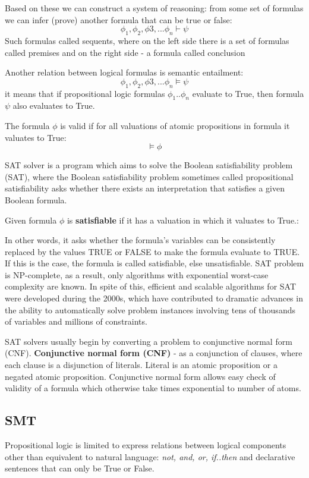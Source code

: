 Based on these we can construct a system of reasoning: from some set of formulas we can infer (prove) another formula that can be true or false:
\[ \phi_1, \phi_2, \phi3, ... \phi_n \vdash \psi \]
Such formulas called sequents, where on the left side there is a set of formulas called premises and on the right side - a formula called conclusion


Another relation between logical formulas  is semantic entailment:
\[ \phi_1, \phi_2, \phi3, ... \phi_n \models \psi \]
it means that if propositional logic formulas $\phi_1 .. \phi_n$ evaluate to True, then formula $\psi$ also evaluates to True.

The formula $\phi$ is valid if for all valuations of atomic propositions in formula it valuates to True:
\[ \models \phi \]


SAT solver is a program which aims to solve the Boolean satisfiability problem 
(SAT), where the Boolean satisfiability problem sometimes called 
propositional satisfiability asks whether there 
exists an interpretation that satisfies a given Boolean formula. 

Given formula  $\phi$ is \textbf{satisfiable} if it has a valuation in which it valuates to True.:

In other words, it asks whether the formula's variables can be 
consistently replaced by the values TRUE or FALSE to make the formula 
evaluate to TRUE. If this is the case, the formula is called satisfiable, 
else unsatisfiable.\cite{Wik1}
SAT problem is NP-complete, as a result, only algorithms with exponential 
worst-case complexity are known. In spite of this, efficient and 
scalable algorithms for SAT were developed during the 2000s, which have 
contributed to dramatic advances in the ability to automatically 
solve problem instances involving tens of thousands of variables and 
millions of constraints.%

SAT solvers usually begin by converting a problem to conjunctive normal form (CNF).
\textbf{Conjunctive normal form (CNF)} - as a conjunction of clauses, where each clause is a disjunction of literals.
Literal is an atomic proposition or a negated atomic proposition.
Conjunctive normal form allows easy check of validity of a formula which otherwise take times exponential to number of atoms.








\subsection {SMT}
Propositional logic is limited to express relations between logical components other than equivalent to natural language: \emph{not, and, or, if..then} and 
declarative sentences that can only be True or False. 

